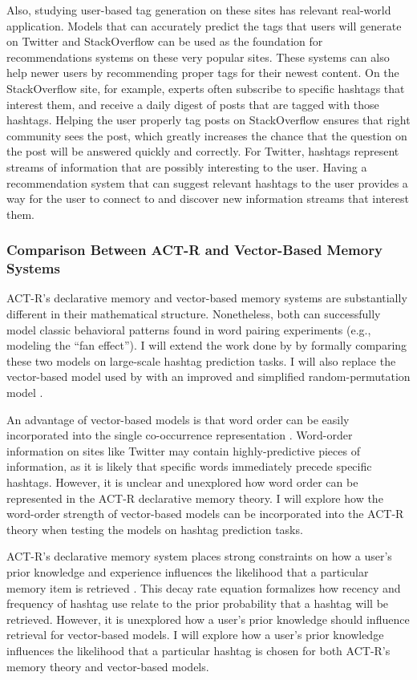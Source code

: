\documentclass[man,floatsintext,donotrepeattitle]{apa6}
\begin{document}
Also, studying user-based tag generation on these sites has relevant real-world application.
Models that can accurately predict the tags that users will generate on Twitter and StackOverflow can be used as the foundation for recommendations systems on these very popular sites.
These systems can also help newer users by recommending proper tags for their newest content.
On the StackOverflow site, for example, experts often subscribe to specific hashtags that interest them, and receive a daily digest of posts that are tagged with those hashtags.
Helping the user properly tag posts on StackOverflow ensures that right community sees the post, which greatly increases the chance that the question on the post will be answered quickly and correctly.
For Twitter, hashtags represent streams of information that are possibly interesting to the user.
Having a recommendation system that can suggest relevant hashtags to the user provides a way for the user to connect to and discover new information streams that interest them.

\subsubsection{Comparison Between ACT-R and Vector-Based Memory Systems}

ACT-R's declarative memory and vector-based memory systems are substantially different in their mathematical structure.
Nonetheless, both can successfully model classic behavioral patterns found in word pairing experiments (e.g., \cite{Rutledge2008} modeling the ``fan effect'').
I will extend the work done by \citeauthor{Rutledge2008} by formally comparing these two models on large-scale hashtag prediction tasks.
I will also replace the vector-based model used by \citeauthor{Rutledge2008} with an improved and simplified random-permutation model \parencite{Sahlgren2008}.

An advantage of vector-based models is that word order can be easily incorporated into the single co-occurrence representation \parencite{Jones2007}.
Word-order information on sites like Twitter may contain highly-predictive pieces of information, as it is likely that specific words immediately precede specific hashtags.
However, it is unclear and unexplored how word order can be represented in the ACT-R declarative memory theory.
I will explore how the word-order strength of vector-based models can be incorporated into the ACT-R theory when testing the models on hashtag prediction tasks.

ACT-R's declarative memory system places strong constraints on how a user's prior knowledge and experience influences the likelihood that a particular memory item is retrieved \parencite{Anderson2007}.
This decay rate equation formalizes how recency and frequency of hashtag use relate to the prior probability that a hashtag will be retrieved.
However, it is unexplored how a user's prior knowledge should influence retrieval for vector-based models.
I will explore how a user's prior knowledge influences the likelihood that a particular hashtag is chosen for both ACT-R's memory theory and vector-based models.
\end{document}
